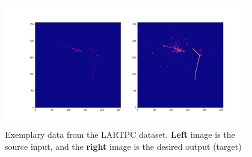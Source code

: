 \begin{figure}[H]
\centering
\includegraphics[width=0.95\textwidth]{figures/chapter7/examplary_data.png}
\caption{Exemplary data from the LARTPC dataset. \textbf{Left} image is the source input, and the \textbf{right} image is the desired output (target)}
\label{fig:lartpc-data-example}
\end{figure}

